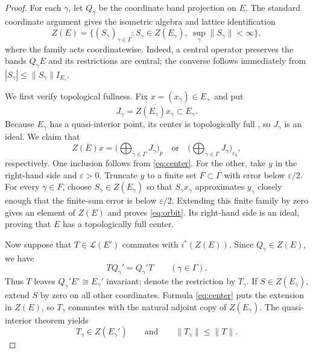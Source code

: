 \documentclass[11pt]{amsart}
\newcommand{\cL}{\mathcal L}
\begin{document}
\begin{proof}
For each $\gamma$, let $Q_\gamma$ be the coordinate band projection on $E$.
The standard coordinate argument gives the isometric algebra and lattice
identification
\begin{equation}\label{eq:center}
 Z(E)=\Big\{(S_\gamma)_{\gamma\in\Gamma}:
 S_\gamma\in Z(E_\gamma),\ 
 \sup_\gamma\|S_\gamma\|<\infty\Big\},
\end{equation}
where the family acts coordinatewise.  Indeed, a central operator preserves
the bands $Q_\gamma E$ and its restrictions are central; the converse follows
immediately from $|S_\gamma|\leq\|S_\gamma\|I_{E_\gamma}$.

We first verify topological fullness.  Fix $x=(x_\gamma)\in E_+$ and put
\[
 J_\gamma=\overline{Z(E_\gamma)x_\gamma}\subset E_\gamma.
\]
Because $E_\gamma$ has a quasi-interior point, its center is topologically
full \cite{Orhon2010}, so $J_\gamma$ is an ideal.  We claim that
\begin{equation}\label{eq:orbit}
 \overline{Z(E)x}=
 \Big(\bigoplus_{\gamma\in\Gamma}J_\gamma\Big)_p
 \quad\text{or}\quad
 \Big(\bigoplus_{\gamma\in\Gamma}J_\gamma\Big)_{c_0},
\end{equation}
respectively.  One inclusion follows from \eqref{eq:center}.  For the other,
take $y$ in the right-hand side and $\varepsilon>0$.  Truncate $y$ to a
finite set $F\subset\Gamma$ with error below $\varepsilon/2$.  For every
$\gamma\in F$, choose $S_\gamma\in Z(E_\gamma)$ so that $S_\gamma x_\gamma$
approximates $y_\gamma$ closely enough that the finite-sum error is below
$\varepsilon/2$.  Extending this finite family by zero gives an element of
$Z(E)$ and proves \eqref{eq:orbit}.  Its right-hand side is an ideal, proving
that $E$ has a topologically full center.

Now suppose that $T\in\cL(E')$ commutes with $i^*(Z(E))$.  Since
$Q_\gamma\in Z(E)$, we have
\[
 TQ_\gamma'=Q_\gamma'T\qquad(\gamma\in\Gamma).
\]
Thus $T$ leaves $Q_\gamma'E'\cong E_\gamma'$ invariant; denote the
restriction by $T_\gamma$.  If $S\in Z(E_\gamma)$, extend $S$ by zero on all
other coordinates.  Formula \eqref{eq:center} puts the extension in $Z(E)$,
so $T_\gamma$ commutes with the natural adjoint copy of $Z(E_\gamma)$.
The quasi-interior theorem \cite[\S9.11(1)]{AAK} yields
\begin{equation}\label{eq:blockcenter}
 T_\gamma\in Z(E_\gamma')
 \qquad\text{and}\qquad
 \|T_\gamma\|\leq\|T\|.
\end{equation}


\end{proof}
\end{document}
